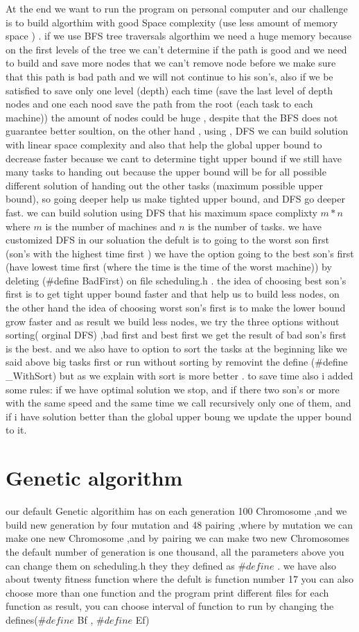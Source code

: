 \documentclass[11pt,fullpage]{article}
\begin{document}
 At the end we want to run the program on personal computer and our challenge is to build algorthim with good Space complexity (use less amount of memory space ) . if we use BFS tree traversals algorthim we need a huge memory because on the first levels of the tree we can't determine if the path is good and we need to build  and save more nodes that we can't remove node before we make sure that this path is bad path and we will not continue to his son's, also if we be satisfied  to save only one level (depth) each time (save the last level of depth nodes and one each nood save the path from the root (each task to each machine))  the amount of nodes could be huge , despite that the BFS does not guarantee better soultion, on the other hand , using , DFS we can build solution with linear space complexity and also that help the global upper bound to decrease faster because we cant to determine tight upper bound if we still have many tasks to handing out because the upper bound will be for all possible different solution of handing out the other tasks (maximum possible upper bound), so going deeper help us make tighted upper bound, and DFS go deeper fast. we can build solution using DFS that his maximum space complixty $m*n$ where $m$ is the number of machines and $n$ is the number of tasks.\newline
we have customized DFS in our soluation the defult is to going to the worst son first (son's with the highest time first ) we have the option going to the best son's first (have lowest time first (where the time is the time of the worst machine)) by deleting ($\#$define BadFirst) on file scheduling.h . the idea of choosing  best son's first is to get tight upper bound faster and that help us to build less nodes, on the other hand the idea of choosing worst son's first is to  make the lower bound grow faster and as result we build less nodes, we try the three options without sorting( orginal DFS) ,bad first and best first we get the result of bad son's first is the best. and we also have to option to sort the tasks at the beginning like we said above big tasks first  or run without sorting by removint the define ($\#$define \_WithSort) but as we explain with sort is more better .
to save time also i added some rules: if we have optimal solution we stop, and if there two son's or more with the same speed and the same time we call recursively only one of them, and if i have solution better than the global upper boung we  update the upper bound to it.   
\section{Genetic algorithm}
our default Genetic algorithim has on each generation 100 Chromosome ,and we build new generation by four mutation and 48 pairing ,where by mutation we can make one new Chromosome ,and by pairing we can make two new Chromosomes the default number of generation is one thousand, all the parameters above you can change them on scheduling.h they they defined as $\#define$ . we have also about twenty fitness function where the defult is function number 17 you can also  choose more than one function and the program print different files  for each function as result, you can choose interval of function to run by changing the defines($\#define   $ Bf ,  $\#define  $ Ef) 
\end{document}
